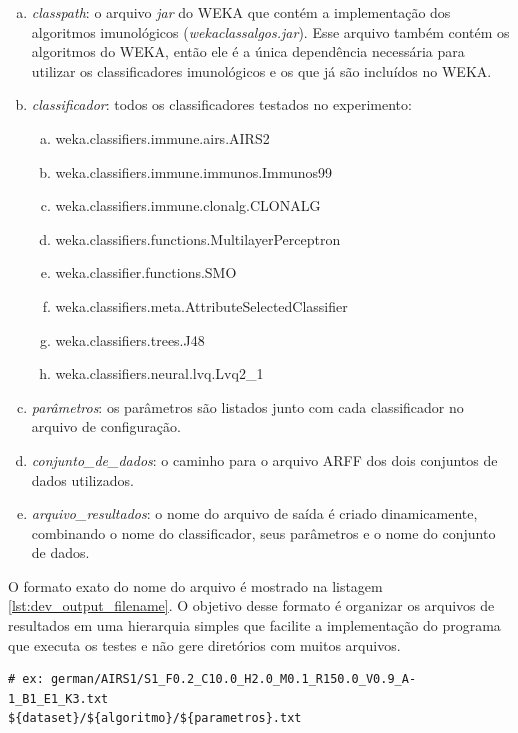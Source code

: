 \begin{enumerate}[a)]
    \item \emph{classpath}: o arquivo \emph{jar} do WEKA que contém a implementação dos algoritmos imunológicos (\emph{wekaclassalgos.jar}). Esse arquivo também contém os algoritmos do WEKA, então ele é a única dependência necessária para utilizar os classificadores imunológicos e os que já são incluídos no WEKA.
    \item \emph{classificador}: todos os classificadores testados no experimento:
        \begin{enumerate}[a)]
            \item weka.classifiers.immune.airs.AIRS2
            \item weka.classifiers.immune.immunos.Immunos99
            \item weka.classifiers.immune.clonalg.CLONALG
            \item weka.classifiers.functions.MultilayerPerceptron
            \item weka.classifier.functions.SMO
            \item weka.classifiers.meta.AttributeSelectedClassifier
            \item weka.classifiers.trees.J48
            \item weka.classifiers.neural.lvq.Lvq2\_1
        \end{enumerate}
    \item \emph{parâmetros}: os parâmetros são listados junto com cada classificador no arquivo de configuração. 
    \item \emph{conjunto\_de\_dados}: o caminho para o arquivo ARFF dos dois conjuntos de dados utilizados.
    \item \emph{arquivo\_resultados}: o nome do arquivo de saída é criado dinamicamente, combinando o nome do classificador, seus parâmetros e o nome do conjunto de dados.
\end{enumerate}

O formato exato do nome do arquivo é mostrado na listagem \ref{lst:dev_output_filename}. O objetivo desse formato é organizar os arquivos de resultados em uma hierarquia simples que facilite a implementação do programa que executa os testes e não gere diretórios com muitos arquivos.

\vspace{0.5cm}
\begin{lstlisting}[caption=Formato do nome do arquivo de resultados, label=lst:dev_output_filename]
# ex: german/AIRS1/S1_F0.2_C10.0_H2.0_M0.1_R150.0_V0.9_A-1_B1_E1_K3.txt
${dataset}/${algoritmo}/${parametros}.txt
\end{lstlisting}
\vspace{0.5cm}

